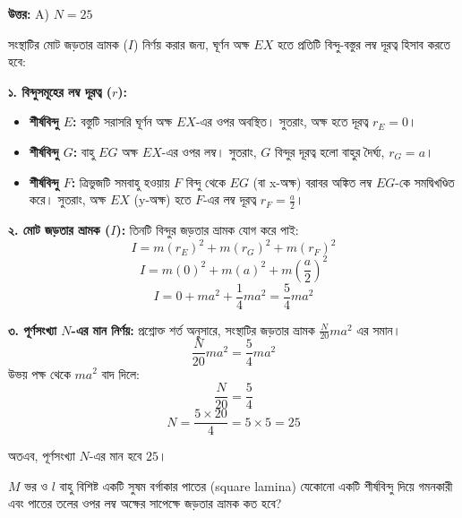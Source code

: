 \documentclass[12pt, a4paper]{article}
\begin{document}
{\vspace{0.5em}
\begin{tcolorbox}[answerbox]
\textbf{\color{success} উত্তর:} A) $N = 25$
\end{tcolorbox}
\vspace{1em}

\begin{tcolorbox}[solutionbox={সমাধান (Solution)}]
\noindent
সংস্থাটির মোট জড়তার ভ্রামক ($I$) নির্ণয় করার জন্য, ঘূর্ণন অক্ষ $EX$ হতে প্রতিটি বিন্দু-বস্তুর লম্ব দূরত্ব হিসাব করতে হবে:

\vspace{0.5em}
\textbf{১. বিন্দুসমূহের লম্ব দূরত্ব ($r$):}
\begin{itemize}[leftmargin=1.5em, itemsep=0.2em]
    \item \textbf{শীর্ষবিন্দু $E$:} বস্তুটি সরাসরি ঘূর্ণন অক্ষ $EX$-এর ওপর অবস্থিত। 
    সুতরাং, অক্ষ হতে দূরত্ব $r_E = 0$।
    
    \item \textbf{শীর্ষবিন্দু $G$:} বাহু $EG$ অক্ষ $EX$-এর ওপর লম্ব। 
    সুতরাং, $G$ বিন্দুর দূরত্ব হলো বাহুর দৈর্ঘ্য, $r_G = a$।
    
    \item \textbf{শীর্ষবিন্দু $F$:} ত্রিভুজটি সমবাহু হওয়ায় $F$ বিন্দু থেকে $EG$ (বা x-অক্ষ) বরাবর অঙ্কিত লম্ব $EG$-কে সমদ্বিখণ্ডিত করে। 
    সুতরাং, অক্ষ $EX$ (y-অক্ষ) হতে $F$-এর লম্ব দূরত্ব $r_F = \frac{a}{2}$।
\end{itemize}

\vspace{0.5em}
\textbf{২. মোট জড়তার ভ্রামক ($I$):}
তিনটি বিন্দুর জড়তার ভ্রামক যোগ করে পাই:
$$I = m (r_E)^2 + m (r_G)^2 + m (r_F)^2$$
$$I = m (0)^2 + m (a)^2 + m \left(\frac{a}{2}\right)^2$$
$$I = 0 + m a^2 + \frac{1}{4} m a^2 = \frac{5}{4} m a^2$$

\vspace{0.5em}
\textbf{৩. পূর্ণসংখ্যা $N$-এর মান নির্ণয়:}
প্রশ্নোক্ত শর্ত অনুসারে, সংস্থাটির জড়তার ভ্রামক $\frac{N}{20} m a^2$ এর সমান। 
$$\frac{N}{20} m a^2 = \frac{5}{4} m a^2$$
উভয় পক্ষ থেকে $m a^2$ বাদ দিলে:
$$\frac{N}{20} = \frac{5}{4}$$
$$N = \frac{5 \times 20}{4} = 5 \times 5 = 25$$

অতএব, পূর্ণসংখ্যা $N$-এর মান হবে $25$।
\end{tcolorbox}
\vspace{1em}
\begin{tcolorbox}[questionbox={প্রশ্ন (Question) 46}]
\noindent
$M$ ভর ও $l$ বাহু বিশিষ্ট একটি সুষম বর্গাকার পাতের (square lamina) যেকোনো একটি শীর্ষবিন্দু দিয়ে গমনকারী এবং পাতের তলের ওপর লম্ব অক্ষের সাপেক্ষে জড়তার ভ্রামক কত হবে?


\end{tcolorbox}}
\end{document}
